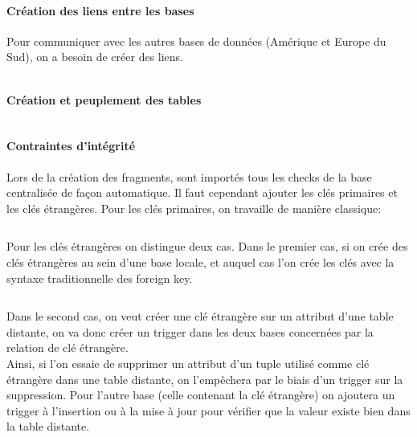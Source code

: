 \documentclass[10pt,a4paper]{article}
\theoremstyle{plain}
\begin{document}
\paragraph{Création des liens entre les bases}

Pour communiquer avec les autres bases de données (Amérique et Europe du Sud), on a besoin de créer des liens.

\inputminted{sql}{INSA-DB12-EuropeNord-creation-liens-db.sql}
\newpage 

\paragraph{Création et peuplement des tables}

\inputminted{sql}{INSA-DB12-EuropeNord-fragmentation.sql}
\newpage 

\paragraph{Contraintes d'intégrité}

Lors de la création des fragments, sont importés tous les checks de la base centralisée de façon automatique. Il faut cependant ajouter les clés primaires et les clés étrangères. Pour les clés primaires, on travaille de manière classique:\\
\inputminted{sql}{INSA-DB12-EuropeNord-contraintes-pk.sql}

\newpage

Pour les clés étrangères on distingue deux cas. Dans le premier cas, si on crée des clés étrangères au sein d'une base locale, et auquel cas l'on crée les clés avec la syntaxe traditionnelle des foreign key.

\inputminted{sql}{INSA-DB12-EuropeNord-contraintes-fk.sql}

Dans le second cas, on veut créer une clé étrangère sur un attribut d'une table distante, on va donc créer un trigger dans les deux bases concernées par la relation de clé étrangère.\\
Ainsi, si l'on essaie de supprimer un attribut d'un tuple utilisé comme clé étrangère dans une table distante, on l'empêchera par le biais d'un trigger sur la suppression. Pour l'autre base (celle contenant la clé étrangère) on ajoutera un trigger à l'insertion ou à la mise à jour pour vérifier que la valeur existe bien dans la table distante. \\

\inputminted{sql}{INSA-DB12-EuropeNord-trigger.sql}
\end{document}
